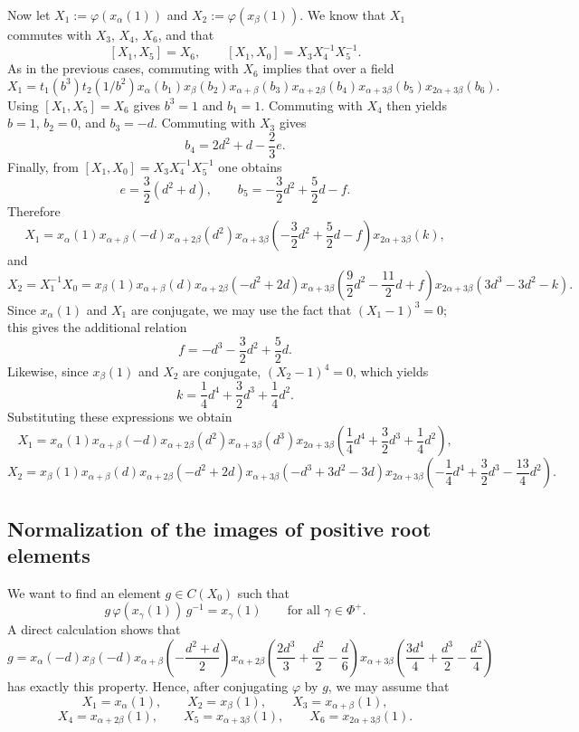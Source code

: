 \documentclass[]{jgcc}
\numberwithin{equation}{section}
\begin{document}
Now let $X_1:=\varphi(x_\alpha(1))$ and $X_2:=\varphi(x_\beta(1))$.
We know that $X_1$ commutes with $X_3$, $X_4$, $X_6$, and that
\[
[X_1,X_5]=X_6,
\qquad
[X_1,X_0]=X_3X_4^{-1}X_5^{-1}.
\]
As in the previous cases, commuting with $X_6$ implies that over a field
\[
X_1=t_1(b^3)t_2(1/b^2)x_\alpha(b_1)x_\beta(b_2)x_{\alpha+\beta}(b_3)x_{\alpha+2\beta}(b_4)x_{\alpha+3\beta}(b_5)x_{2\alpha+3\beta}(b_6).
\]
Using $[X_1,X_5]=X_6$ gives $b^3=1$ and $b_1=1$.
Commuting with $X_4$ then yields $b=1$, $b_2=0$, and $b_3=-d$.
Commuting with $X_3$ gives
\[
b_4=2d^2+d-\frac{2}{3}e.
\]
Finally, from $[X_1,X_0]=X_3X_4^{-1}X_5^{-1}$ one obtains
\[
e=\frac{3}{2}(d^2+d),\qquad b_5=-\frac{3}{2}d^2+\frac{5}{2}d-f.
\]
Therefore
\[
X_1=x_\alpha(1)x_{\alpha+\beta}(-d)x_{\alpha+2\beta}(d^2)x_{\alpha+3\beta}\!\left(-\frac{3}{2}d^2+\frac{5}{2}d-f\right)x_{2\alpha+3\beta}(k),
\]
and
\[
X_2=X_1^{-1}X_0=x_\beta(1)x_{\alpha+\beta}(d)x_{\alpha+2\beta}(-d^2+2d)x_{\alpha+3\beta}\!\left(\frac{9}{2}d^2-\frac{11}{2}d+f\right)x_{2\alpha+3\beta}(3d^3-3d^2-k).
\]
Since $x_\alpha(1)$ and $X_1$ are conjugate, we may use the fact that $(X_1-1)^3=0$; this gives the additional relation
\[
f=-d^3-\frac{3}{2}d^2+\frac{5}{2}d.
\]
Likewise, since $x_\beta(1)$ and $X_2$ are conjugate, $(X_2-1)^4=0$, which yields
\[
k=\frac{1}{4}d^4+\frac{3}{2}d^3+\frac{1}{4}d^2.
\]
Substituting these expressions we obtain
\begin{equation}\label{eq:G2-X1-final}
X_1=x_\alpha(1)x_{\alpha+\beta}(-d)x_{\alpha+2\beta}(d^2)x_{\alpha+3\beta}(d^3)x_{2\alpha+3\beta}\!\left(\frac{1}{4}d^4+\frac{3}{2}d^3+\frac{1}{4}d^2\right),
\end{equation}
\begin{equation}\label{eq:G2-X2-final}
X_2=x_\beta(1)x_{\alpha+\beta}(d)x_{\alpha+2\beta}(-d^2+2d)x_{\alpha+3\beta}(-d^3+3d^2-3d)x_{2\alpha+3\beta}\!\left(-\frac{1}{4}d^4+\frac{3}{2}d^3-\frac{13}{4}d^2\right).
\end{equation}

\subsection{Normalization of the images of positive root elements}

We want to find an element $g\in C(X_0)$ such that
\[
g\,\varphi(x_\gamma(1))\,g^{-1}=x_\gamma(1)
\qquad\text{for all }\gamma\in\Phi^+.
\]
A direct calculation shows that
\[
g=x_\alpha(-d)x_\beta(-d)x_{\alpha+\beta}\left( -\frac{d^2+d}{2} \right)
x_{\alpha+2\beta}\left( \frac{2d^3}{3}+\frac{d^2}{2}-\frac{d}{6} \right)
x_{\alpha+3\beta}\left( \frac{3d^4}{4} + \frac{d^3}{2} - \frac{d^2}{4}\right)
\]
has exactly this property.
Hence, after conjugating $\varphi$ by $g$, we may assume that
\[
X_1=x_\alpha(1),\qquad X_2=x_\beta(1),\qquad X_3=x_{\alpha+\beta}(1),
\]
\[
X_4=x_{\alpha+2\beta}(1),\qquad X_5=x_{\alpha+3\beta}(1),\qquad X_6=x_{2\alpha+3\beta}(1).
\]
\end{document}
